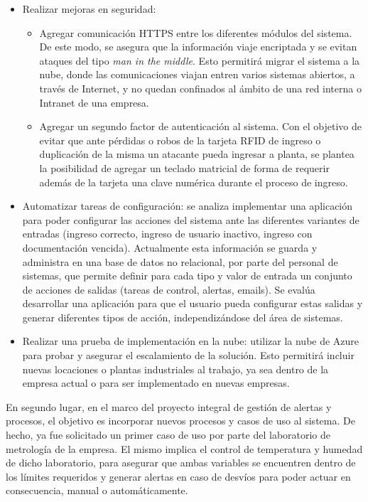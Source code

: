 \begin{itemize}
\item Realizar mejoras en seguridad:

   \begin{itemize}
      \item Agregar comunicación HTTPS entre los diferentes módulos del sistema. De este modo, se asegura que la información viaje encriptada y se evitan ataques del tipo \textit{man in the middle}. Esto permitirá migrar el sistema a la nube, donde las comunicaciones viajan entren varios sistemas abiertos, a través de Internet, y no quedan confinados al ámbito de una red interna o Intranet de una empresa.
      \item Agregar un segundo factor de autenticación al sistema. Con el objetivo de evitar que ante pérdidas o robos de la tarjeta RFID de ingreso o duplicación de la misma un atacante pueda ingresar a planta, se plantea la posibilidad de agregar un teclado matricial de forma de requerir además de la tarjeta una clave numérica durante el proceso de ingreso.
   \end{itemize}
      
   \item Automatizar tareas de configuración: se analiza implementar una aplicación para poder configurar las acciones del sistema ante las diferentes variantes de entradas (ingreso correcto, ingreso de usuario inactivo, ingreso con documentación vencida). Actualmente esta información se guarda y administra en una base de datos no relacional, por parte del personal de sistemas, que permite definir para cada tipo y valor de entrada un conjunto de acciones de salidas (tareas de control, alertas, emails). Se evalúa desarrollar una aplicación para que el usuario pueda configurar estas salidas y generar diferentes tipos de acción, independizándose del área de sistemas.
   \item Realizar una prueba de implementación en la nube: utilizar la nube de Azure para probar y asegurar el escalamiento de la solución. Esto permitirá incluir nuevas locaciones o plantas industriales al trabajo, ya sea dentro de la empresa actual o para ser implementado en nuevas empresas.
\end{itemize}   

En segundo lugar, en el marco del proyecto integral de gestión de alertas y procesos, el objetivo es incorporar nuevos procesos y casos de uso al sistema. De hecho, ya fue solicitado un primer caso de uso por parte del laboratorio de metrología de la empresa. El mismo implica el control de temperatura y humedad de dicho laboratorio, para asegurar que ambas variables se encuentren dentro de los límites requeridos y generar alertas en caso de desvíos para poder actuar en consecuencia, manual o automáticamente. 

